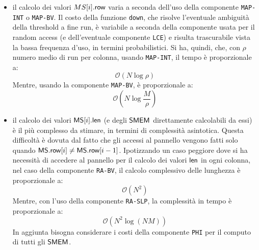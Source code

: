 \begin{itemize}
  \item il calcolo dei valori $MS[i].\mbox{\rm {\sf row}}$ varia a
  seconda dell'uso 
  della componente \texttt{MAP-INT} o \texttt{MAP-BV}. Il costo della funzione
  \texttt{down}, che risolve l'eventuale ambiguità della threshold a fine run,
  è variabile a seconda della componente usata per il random access (e 
  dell'eventuale componente \texttt{LCE}) e risulta trascurabile vista la bassa
  frequenza d'uso, in termini probabilistici. Si ha, quindi, che, con $\rho$
  numero medio di run per colonna, usando \texttt{MAP-INT}, il tempo è
  proporzionale a:
  \begin{equation}
    \label{eq:msthr1int}
    \mathcal{O}(N\log\rho)
  \end{equation}
  Mentre, usando la componente \texttt{MAP-BV}, è proporzionale a:
  \begin{equation}
    \label{eq:msthr1bv}
    \mathcal{O}\left(N\log\frac{M}{\rho}\right)
  \end{equation}
  \item il calcolo dei valori $\mbox{\rm {\sf MS}}[i].\mbox{\rm {\sf len}}$ (e degli $\mbox{\rm {\sf SMEM}}$ direttamente
  calcolabili da essi) è il
  più complesso da 
  stimare, in termini di complessità asintotica. Questa difficoltà è dovuta dal
  fatto che gli accessi al pannello vengono fatti solo quando $\mbox{\rm {\sf MS}}.\mbox{\rm {\sf row}}[i]\neq
  \mbox{\rm {\sf MS}}.\mbox{\rm {\sf row}}[i-1]$.
  Ipotizzando un caso peggiore dove si ha necessità di accedere al pannello per
  il calcolo dei valori $\mbox{\rm {\sf len}}$ in
  ogni 
  colonna, nel caso della componente \texttt{RA-BV}, il calcolo
  complessivo delle lunghezza è proporzionale a:
  \begin{equation}
    \label{eq:msthr2bv}
    \mathcal{O}(N^2)
  \end{equation}
  Mentre, con l'uso della componente \texttt{RA-SLP}, la complessità in tempo
  è proporzionale a: 
  \begin{equation}
    \label{eq:msthr2slp}
    \mathcal{O}\left(N^2\log (\mathit{NM})\right)
  \end{equation} 
  In aggiunta bisogna considerare i costi della componente \texttt{PHI} per il
  computo di tutti gli $\mbox{\rm {\sf SMEM}}$.
\end{itemize}
